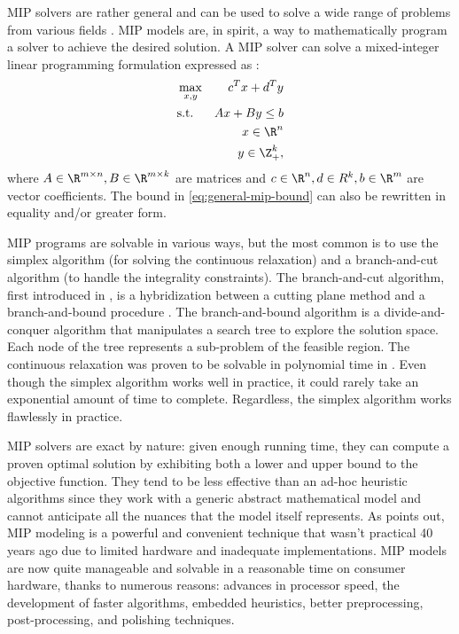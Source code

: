 MIP solvers are rather general and can be used to solve a wide range of problems from various fields \parencite{bixby2007progress}.
MIP models are, in spirit, a way to mathematically program a solver to achieve the desired solution.
A MIP solver can solve a mixed-integer linear programming formulation
expressed as \parencite{wolsey1999integer}:
\begin{align}
	 & \max_{x, y} & c^T x + d^T y                                 \\
	 & \text{s.t.} & A x + B y \le b  \label{eq:general-mip-bound} \\
	 &             & x \in \R^n                                    \\
	 &             & y \in \Z_{+}^k,
\end{align}
where $A \in \R^{m \times n}, B \in \R^{m \times k}$ are matrices and
$c \in \R^n, d \in R^k, b \in \R^m$ are vector coefficients.
The bound in \cref{eq:general-mip-bound} can also be rewritten in equality and/or greater form.

MIP programs are solvable in various ways,
but the most common is to use the simplex algorithm (for solving the continuous relaxation)
and a branch-and-cut algorithm (to handle the integrality constraints).
The branch-and-cut algorithm,
first introduced in \textcite{padberg1991},
is a hybridization between a cutting plane method
and a branch-and-bound procedure \parencite{land2010}.
The branch-and-bound algorithm is a divide-and-conquer algorithm
that manipulates a search tree to explore the solution space.
Each node of the tree represents a sub-problem of the feasible region.
The continuous relaxation was proven to be solvable in polynomial time in \textcite {khachiyan1979polynomial}.
Even though the simplex algorithm works well in practice,
it could rarely take an exponential amount of time to complete.
Regardless, the simplex algorithm works flawlessly in practice.

MIP solvers are exact by nature: given enough running time,
they can compute a proven optimal solution by exhibiting both a lower and upper bound
to the objective function.
They tend to be less effective than an ad-hoc heuristic algorithms
since they work with a generic abstract mathematical model
and cannot anticipate all the nuances that the model itself represents.
As \textcite{bixby1999mip} points out,
MIP modeling is a powerful and convenient technique that wasn't practical 40 years ago due
to limited hardware and inadequate implementations.
MIP models are now quite manageable and solvable in a reasonable time on consumer hardware,
thanks to numerous reasons:
advances in processor speed, the development of faster algorithms,
embedded heuristics, better preprocessing, post-processing, and polishing techniques.

